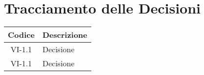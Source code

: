 \section*{Tracciamento delle Decisioni}

\begin{center}
	\begin{longtable}{|c|p{14.5cm}|}
	\hline
	\rowcolor{lighter-grayer}
	\textbf{Codice} & \textbf{Descrizione} \\
	\hline
	\endfirsthead
	\hline
	VI-1.1 & Decisione \\
	VI-1.1 & Decisione \\
	\hline

	\end{longtable}
\end{center}